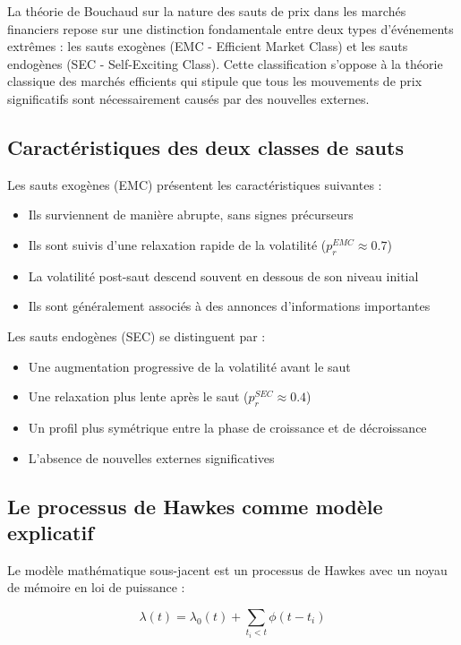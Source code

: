 \documentclass[12pt,a4paper]{article}
\theoremstyle{definition}
\theoremstyle{remark}
\begin{document}
La théorie de Bouchaud sur la nature des sauts de prix dans les marchés financiers repose sur une distinction fondamentale entre deux types d'événements extrêmes : les sauts exogènes (EMC - Efficient Market Class) et les sauts endogènes (SEC - Self-Exciting Class). Cette classification s'oppose à la théorie classique des marchés efficients qui stipule que tous les mouvements de prix significatifs sont nécessairement causés par des nouvelles externes.

\subsection{Caractéristiques des deux classes de sauts}

Les sauts exogènes (EMC) présentent les caractéristiques suivantes :
\begin{itemize}
    \item Ils surviennent de manière abrupte, sans signes précurseurs
    \item Ils sont suivis d'une relaxation rapide de la volatilité ($p_r^{EMC} \approx 0.7$)
    \item La volatilité post-saut descend souvent en dessous de son niveau initial
    \item Ils sont généralement associés à des annonces d'informations importantes
\end{itemize}

Les sauts endogènes (SEC) se distinguent par :
\begin{itemize}
    \item Une augmentation progressive de la volatilité avant le saut
    \item Une relaxation plus lente après le saut ($p_r^{SEC} \approx 0.4$)
    \item Un profil plus symétrique entre la phase de croissance et de décroissance
    \item L'absence de nouvelles externes significatives
\end{itemize}

\subsection{Le processus de Hawkes comme modèle explicatif}

Le modèle mathématique sous-jacent est un processus de Hawkes avec un noyau de mémoire en loi de puissance :

\begin{equation}
\lambda(t) = \lambda_0(t) + \sum_{t_i < t} \phi(t-t_i)
\end{equation}
\end{document}
